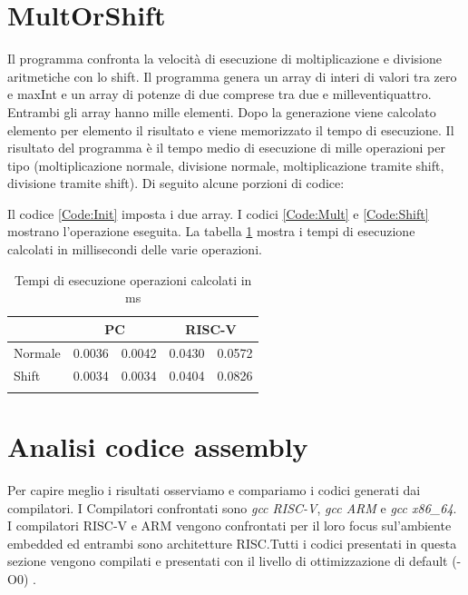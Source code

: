 \documentclass[12pt, a4paper]{report}
\begin{document}
\section{MultOrShift}
Il programma confronta la velocità di esecuzione di moltiplicazione e divisione aritmetiche con lo shift. Il programma genera un array di interi di valori tra zero e maxInt e un array di potenze di due comprese tra due e milleventiquattro. Entrambi gli array hanno mille elementi. Dopo la generazione viene calcolato elemento per elemento il risultato e viene memorizzato il tempo di esecuzione. Il risultato del programma è il tempo medio di esecuzione di mille operazioni per tipo (moltiplicazione normale, divisione normale, moltiplicazione tramite shift, divisione tramite shift). Di seguito alcune porzioni di codice:





Il codice \ref{Code:Init} imposta i due array. I codici \ref{Code:Mult} e \ref{Code:Shift} mostrano l'operazione eseguita.
La tabella \ref{Tab:tempi_esecuzioneMS} mostra i tempi di esecuzione calcolati in millisecondi delle varie operazioni.

\begin{table}[ht]
\centering
\begin{tabular}{lcccc}
\cline{2-5}
\multicolumn{1}{l|}{} & \multicolumn{2}{c|}{PC} & \multicolumn{2}{c|}{RISC-V} \\ \hline
\multicolumn{1}{|l|}{Normale} & \multicolumn{1}{c|}{0.0036} & \multicolumn{1}{c|}{0.0042} & \multicolumn{1}{c|}{0.0430} & \multicolumn{1}{c|}{0.0572} \\ \hline
\multicolumn{1}{|l|}{Shift} & \multicolumn{1}{c|}{0.0034} & \multicolumn{1}{c|}{0.0034} & \multicolumn{1}{c|}{0.0404} & \multicolumn{1}{c|}{0.0826} \\ \hline
 & \multicolumn{1}{l}{} & \multicolumn{1}{l}{} & \multicolumn{1}{l}{} & \multicolumn{1}{l}{} 
\end{tabular}
	\caption{Tempi di esecuzione operazioni calcolati in ms}
	\label{Tab:tempi_esecuzioneMS}
\end{table}
	
	
\section{Analisi codice assembly}
Per capire meglio i risultati osserviamo e compariamo i codici generati dai compilatori. I Compilatori confrontati sono \textit{gcc RISC-V}, \textit{gcc ARM} e \textit{gcc x86\_64}. I compilatori RISC-V e ARM vengono confrontati per il loro focus sul'ambiente embedded ed entrambi sono architetture RISC.Tutti i codici presentati in questa sezione vengono compilati e presentati con il livello di ottimizzazione di default (-O0) \cite{ConfrontoISABook}.
\end{document}
